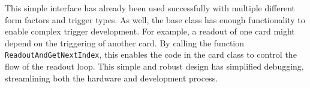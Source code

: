 This simple interface has already been used successfully with multiple different form factors and trigger
types.  As well, the base class has enough functionality to enable complex trigger development.  For example,
a readout of one card might depend on the triggering of another card.  By calling the function \lstinline!ReadoutAndGetNextIndex!, this enables the code in the card class to control the flow of the readout loop. This simple and robust design
has simplified debugging, streamlining both the hardware and development process.
%
%
%
%
%  
%
%
%
